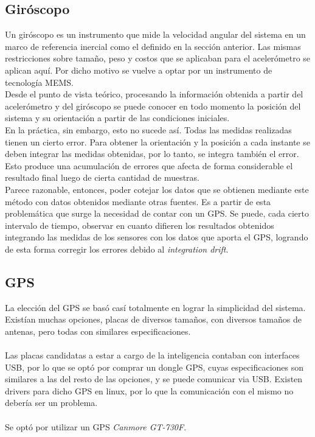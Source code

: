 \documentclass[main]{subfiles}
\begin{document}
\subsection{Gir\'oscopo}
\label{giro}
\vspace*{15pt}

Un gir\'oscopo es un instrumento que mide la velocidad angular del sistema en un marco de referencia inercial como el definido en la secci\'on anterior. Las mismas restricciones sobre tama\~no, peso y costos que se aplicaban para el aceler\'ometro se aplican aqu\'i. Por dicho motivo se vuelve a optar por un instrumento de tecnolog\'ia MEMS.\\ 


Desde el punto de vista te\'orico, procesando la informaci\'on obtenida a partir del aceler\'ometro y del gir\'oscopo se puede conocer en todo momento la posici\'on del sistema y su orientaci\'on a partir de las condiciones iniciales.\\
En la pr\'actica, sin embargo, esto no sucede as\'i. Todas las medidas realizadas tienen un cierto error. Para obtener la orientaci\'on y la posici\'on a cada instante se deben integrar las medidas obtenidas, por lo tanto, se integra tambi\'en el error. Esto produce una acumulaci\'on de errores que afecta de forma considerable el resultado final luego de cierta cantidad de muestras.\\
Parece razonable, entonces, poder cotejar los datos que se obtienen mediante este m\'etodo con datos obtenidos mediante otras fuentes. Es a partir de esta problem\'atica que surge la necesidad de contar con un GPS. Se puede, cada cierto intervalo de tiempo, observar en cuanto difieren los resultados obtenidos integrando las medidas de los sensores con los datos que aporta el GPS, logrando de esta forma corregir los errores debido al \emph{integration drift}.

\subsection{GPS}
\vspace*{15pt}

La elecci\'on del GPS se bas\'o cas\'i totalmente en lograr la simplicidad del sistema. Exist\'ian muchas opciones, placas de diversos tama\~nos, con diversos tama\~nos de antenas, pero todas con similares especificaciones.\\
\\
Las placas candidatas a estar a cargo de la inteligencia contaban con interfaces USB, por lo que se opt\'o por comprar un dongle GPS, cuyas especificaciones son similares a las del resto de las opciones, y se puede comunicar via USB. Existen drivers para dicho GPS en linux, por lo que la comunicaci\'on con el mismo no deber\'ia ser un problema.\\
\\
Se opt\'o por utilizar un GPS \textit{Canmore GT-730F}.
\end{document}
